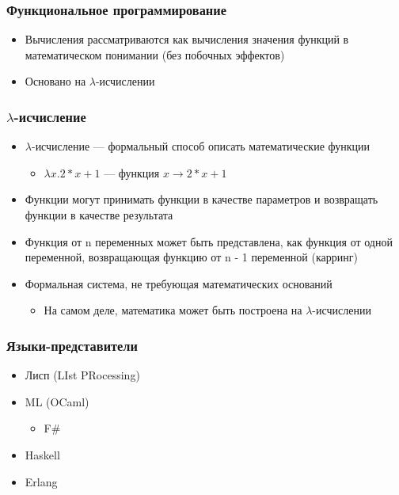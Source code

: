 \documentclass{../../slides-style}
\begin{document}
    \begin{frame}
        \frametitle{Функциональное программирование}
        \begin{itemize}
            \item Вычисления рассматриваются как вычисления значения функций в математическом понимании (без побочных эффектов)
            \item Основано на $\lambda$-исчислении
        \end{itemize}
    \end{frame}

    \begin{frame}
        \frametitle{$\lambda$-исчисление}
        \begin{itemize}
            \item $\lambda$-исчисление --- формальный способ описать математические функции
            \begin{itemize}
                \item $\lambda{x}.2 * x + 1$ --- функция $x \rightarrow 2 * x + 1$
            \end{itemize}
            \item Функции могут принимать функции в качестве параметров и возвращать функции в качестве результата
            \item Функция от n переменных может быть представлена, как функция от одной переменной, возвращающая функцию от n - 1 переменной (карринг)
            \item Формальная система, не требующая математических оснований
            \begin{itemize}
                \item На самом деле, математика может быть построена на $\lambda$-исчислении
            \end{itemize}
        \end{itemize}
    \end{frame}

    \begin{frame}
        \frametitle{Языки-представители}
        \begin{itemize}
            \item Лисп (LIst PRocessing)
            \item ML (OCaml)
            \begin{itemize}
                \item F\#
            \end{itemize}
            \item Haskell
            \item Erlang
        \end{itemize}
    \end{frame}
\end{document}
